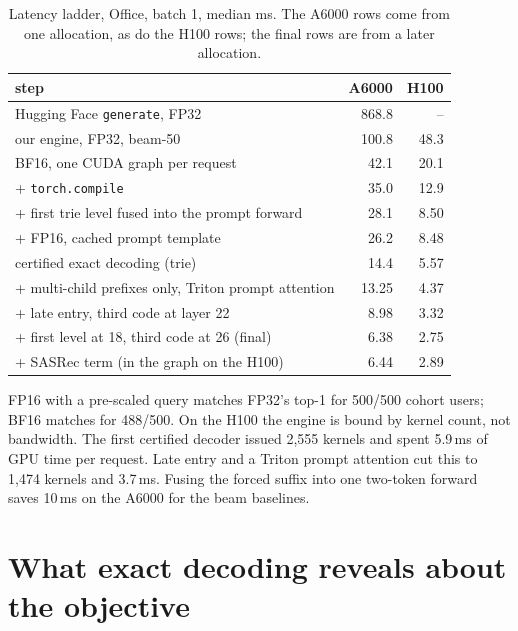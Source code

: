 \documentclass[sigconf,anonymous]{acmart}
\begin{document}
\begin{table}[h]
\caption{Latency ladder, Office, batch 1, median ms. The A6000 rows come from one allocation, as do the H100
rows; the final rows are from a later allocation.}
\label{tab:ladder}
\vspace{-2mm}
\small
\setlength{\tabcolsep}{3pt}
\begin{tabular*}{\linewidth}{@{\extracolsep{\fill}}lrr@{}}
\toprule
step & A6000 & H100 \\
\midrule
Hugging Face \texttt{generate}, FP32                 & 868.8 & -- \\
our engine, FP32, beam-50                            & 100.8 & 48.3 \\
BF16, one CUDA graph per request                     & 42.1  & 20.1 \\
+ \texttt{torch.compile}                             & 35.0  & 12.9 \\
+ first trie level fused into the prompt forward     & 28.1  & 8.50 \\
+ FP16, cached prompt template                       & 26.2  & 8.48 \\
certified exact decoding (trie)                      & 14.4  & 5.57 \\
+ multi-child prefixes only, Triton prompt attention & 13.25 & 4.37 \\
+ late entry, third code at layer 22                 & 8.98  & 3.32 \\
+ first level at 18, third code at 26 (final)        & 6.38  & 2.75 \\
+ SASRec term (in the graph on the H100)             & 6.44  & 2.89 \\
\bottomrule
\end{tabular*}
\end{table}

FP16 with a pre-scaled query matches FP32's top-1 for 500/500 cohort users; BF16 matches for 488/500. On the H100
the engine is bound by kernel count, not bandwidth. The first certified decoder issued 2,555 kernels and spent
5.9\,ms of GPU time per request. Late entry and a Triton prompt attention cut this to 1,474 kernels and 3.7\,ms.
Fusing the forced suffix into one two-token forward saves 10\,ms on the A6000 for the beam baselines.

\section{What exact decoding reveals about the objective}
\label{app:objective}
\end{document}
